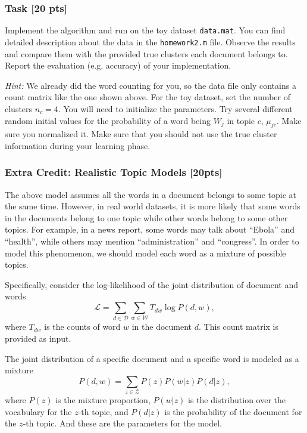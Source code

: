 \documentclass[twoside,10pt]{article}
\begin{document}
\subsubsection*{Task [20
pts]}

Implement the algorithm and run on the toy dataset \texttt{data.mat}. You
can find detailed description about the data in the
\texttt{homework2.m} file. Observe the results and compare them with
the provided true clusters each document belongs to. Report the
evaluation (e.g. accuracy) of your implementation.

\emph{Hint:} We already did the word counting for you, so the data
file only contains a count matrix like the one shown above. For the toy dataset, set the
number of clusters $n_c = 4$. You will need to initialize the
parameters. Try several different random initial values for the
probability of a word being $W_j$ in topic $c$, $\mu_{jc}$. Make
sure you normalized it. Make sure that you should not use the true
cluster information during your learning phase.


\subsubsection*{Extra Credit: Realistic Topic Models [20pts]}
The above model assumes all the words in a document belongs to some topic at the same time. However, in real world datasets, it is more likely that
some words in the documents belong to one topic while other words belong to some other topics. For example, in a news report, some words may talk about ``Ebola'' and ``health'', while others may mention ``administration'' and ``congress''. In order to model this phenomenon, we should model each word as a mixture of possible topics.

Specifically, consider the log-likelihood of the joint distribution of document and words
\begin{equation}
\mathcal{L} = \sum_{d\in \mathcal{D}}\sum_{w \in \mathcal{W}} T_{dw} \log P(d, w),
\end{equation}
where $T_{dw}$ is the counts of word $w$ in the document $d$. This count matrix is provided as input.

The joint distribution of a specific document and a specific word is modeled as a mixture
\begin{equation}
P(d, w) = \sum_{z \in \mathcal{Z}} P(z) P(w|z) P(d|z),
\end{equation}
where $P(z)$ is the mixture proportion, $P(w|z)$ is the distribution over the vocabulary for the $z$-th topic, and $P(d|z)$ is the probability of the document for the $z$-th topic. And these are the parameters for the model.
\end{document}
